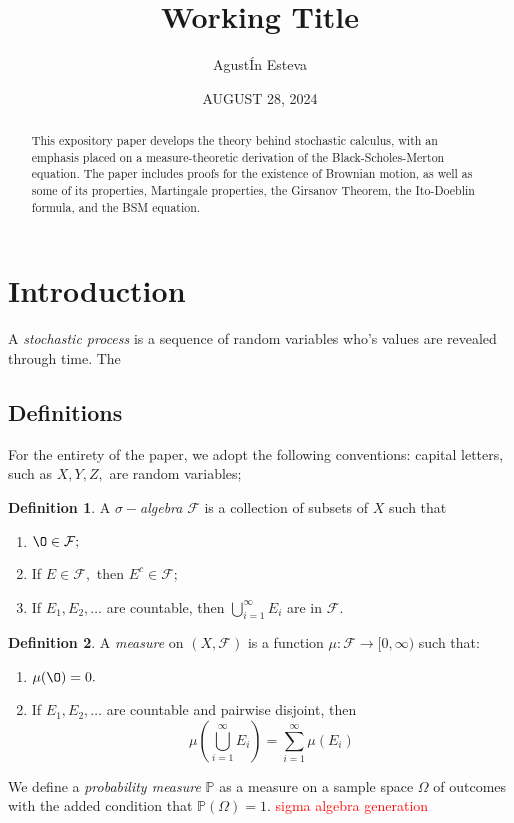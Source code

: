 \documentclass[openany, amssymb, psamsfonts]{amsart}
\title{Working Title}
\author{AgustÍn Esteva}
\date{AUGUST 28, 2024}
\theoremstyle{definition}
\newtheorem{defn}{Definition}[section]
\numberwithin{equation}{section}
\newcommand{\bbP}{\mathbb{P}}
\renewcommand{\emptyset}{\O}
\begin{document}
\begin{abstract}

This expository paper develops the theory behind stochastic calculus, with an emphasis placed on a measure-theoretic derivation of the Black-Scholes-Merton equation. 
The paper includes proofs for the existence of Brownian motion, as well as some of its properties, Martingale properties, the Girsanov Theorem, the Ito-Doeblin formula, and the BSM equation. 
\end{abstract}

\maketitle

\tableofcontents
\section{Introduction}
A \textit{stochastic process} is a sequence of random variables who's values are revealed through time. The 

\subsection{Definitions}
For the entirety of the paper, we adopt the following conventions: capital letters, such as $X,Y,Z,$ are random variables; 
\begin{defn}
A \textit{$\sigma-$algebra} $\mathcal{F}$ is a collection of subsets of $X$ such that
\begin{enumerate}
    \item $\emptyset \in \mathcal{F};$
    \item If $E \in \mathcal{F},$ then $E^c\in \mathcal{F};$
    \item If $E_1, E_2, \dots$ are countable, then $\displaystyle\bigcup_{i=1}^\infty E_i$ are in $\mathcal{F}.$
\end{enumerate}
\end{defn}

\begin{defn}
A \textit{measure} on $(X, \mathcal{F})$ is a function $\mu: \mathcal{F}\to [0,\infty)$ such that:
\begin{enumerate}
    \item $\mu(\emptyset) = 0.$
    \item If $E_1, E_2, \dots$ are countable and pairwise disjoint, then 
    \[\mu(\bigcup_{i=1}^\infty E_i) = \sum_{i=1}^\infty \mu(E_i)\]
\end{enumerate}
\end{defn}
We define a \textit{probability measure} $\bbP$ as a measure on a sample space $\Omega$ of outcomes with the added condition that $\bbP(\Omega) =1.$
\textcolor{red}{sigma algebra generation}
\end{document}
